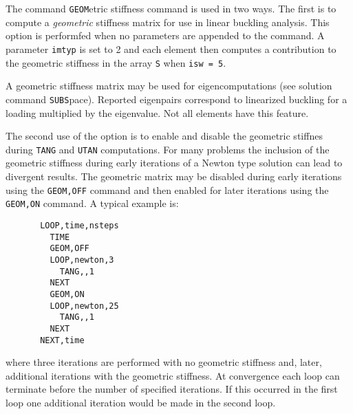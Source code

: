 \\{\smallskip}
 \\{\smallskip}
\headb

The command {\tt GEOM}etric stiffness command is used in two ways.
The first is to compute a {\it geometric} stiffness matrix for use
in linear buckling analysis.  This option is performfed when no
parameters are appended to the command. A parameter {\tt imtyp} is set
to 2 and each element then computes a contribution
to the geometric stiffness in the array {\tt S} when {\tt isw = 5}.

A geometric stiffness matrix may be used for eigen\-computations
(see solution command {\tt SUBS}pace).  Reported eigenpairs
correspond to linearized buckling for a loading multiplied
by the eigenvalue.  Not all elements have this feature.

The second use of the option is to enable and disable the geometric stiffnes
during {\tt TANG} and {\tt UTAN} computations.  For many problems the inclusion
of the geometric stiffness during early iterations of a Newton type solution
can lead to divergent results.  The geometric matrix may be disabled during
early iterations using the {\tt GEOM,OFF} command and then enabled for later
iterations using the {\tt GEOM,ON} command.  A typical example is:

\begin{verbatim}
       LOOP,time,nsteps
         TIME
         GEOM,OFF
         LOOP,newton,3
           TANG,,1
         NEXT
         GEOM,ON
         LOOP,newton,25
           TANG,,1
         NEXT
       NEXT,time
\end{verbatim}
where three iterations are performed with no geometric stiffness and, later,
additional iterations with the geometric stiffness.  At convergence each
loop can terminate before the number of specified iterations.  If this occurred
in the first loop one additional iteration would be made in the second loop.
\vfill\eject
